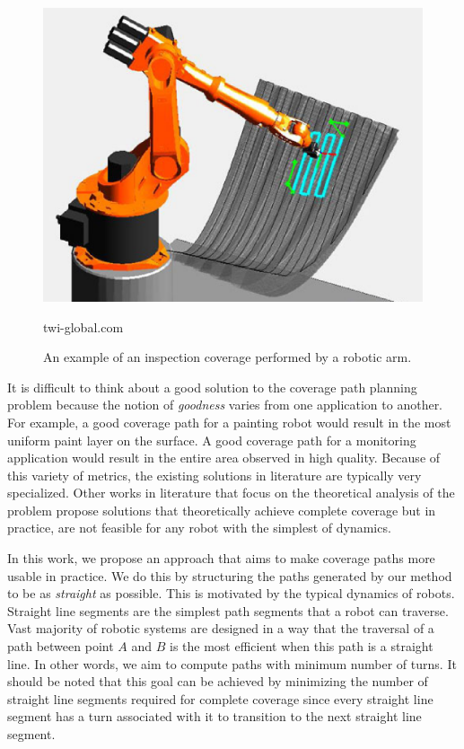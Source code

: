 \documentclass[../main.tex]{subfiles}
\begin{document}
\begin{figure}
	\centering
	\includegraphics[scale=0.5]{img/chapter_1/example_coverage.eps}
	\vskip-15pt
	\caption*{\tiny twi-global.com}
	\caption{An example of an inspection coverage performed by a robotic arm.}
	\label{img:example_coverage}
\end{figure}

It is difficult to think about a good solution to the coverage path planning problem because the notion of \emph{goodness} varies from one application to another. For example, a good coverage path for a painting robot would result in the most uniform paint layer on the surface. A good coverage path for a monitoring application would result in the entire area observed in high quality. Because of this variety of metrics, the existing solutions in literature are typically very specialized. Other works in literature that focus on the theoretical analysis of the problem propose solutions that theoretically achieve complete coverage but in practice, are not feasible for any robot with the simplest of dynamics.

In this work, we propose an approach that aims to make coverage paths more usable in practice. We do this by structuring the paths generated by our method to be as \emph{straight} as possible. This is motivated by the typical dynamics of robots. Straight line segments are the simplest path segments that a robot can traverse. Vast majority of robotic systems are designed in a way that the traversal of a path between point $A$ and $B$ is the most efficient when this path is a straight line. In other words, we aim to compute paths with minimum number of turns. It should be noted that this goal can be achieved by minimizing the number of straight line segments required for complete coverage since every straight line segment has a turn associated with it to transition to the next straight line segment.
\end{document}

